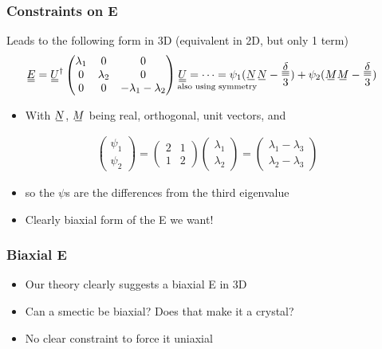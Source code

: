 \documentclass[10pt,mathserif]{beamer}
\begin{document}
\begin{frame}
    \frametitle{Constraints on E}
    Leads to the following form in 3D \color{gray} (equivalent in 2D, but only 1 term) \normalcolor
    \begin{align*}
        \du{E} &= \du{U}^\dagger \begin{pmatrix}
            \lambda_1 & 0 & 0 \\
            0 & \lambda_2 & 0 \\
            0 & 0 & - \lambda_1 - \lambda_2
        \end{pmatrix} \underset{\text{also using symmetry}}{\du{U} = \cdots = \psi_1(\su{N}}\su{N} - \frac{\du{\delta}}{3}) + \psi_2(\su{M}\su{M} - \frac{\du{\delta}}{3})
    \end{align*}
    \begin{itemize}
        \item With $\su{N}$, $\su{M}$ being real, orthogonal, unit vectors, and
    \end{itemize}
    \begin{align*}
        \begin{pmatrix} \psi_1 \\ \psi_2 \end{pmatrix} = \begin{pmatrix} 2 & 1 \\ 1 & 2 \end{pmatrix} \begin{pmatrix} \lambda_1 \\ \lambda_2 \end{pmatrix} = \begin{pmatrix} \lambda_1 - \lambda_3 \\ \lambda_2 - \lambda_3 \end{pmatrix}
    \end{align*}
    \begin{itemize}
        \item \color{gray} so the $\psi$s are the differences from the third eigenvalue\normalcolor
        \item Clearly biaxial form of the E we want!
    \end{itemize}
\end{frame}

\begin{frame}
    \frametitle{Biaxial E}
    \begin{itemize}
        \item Our theory clearly suggests a biaxial E in 3D
        \item Can a smectic be biaxial? Does that make it a crystal?
        \item No clear constraint to force it uniaxial
    \end{itemize}
\end{frame}
\end{document}

